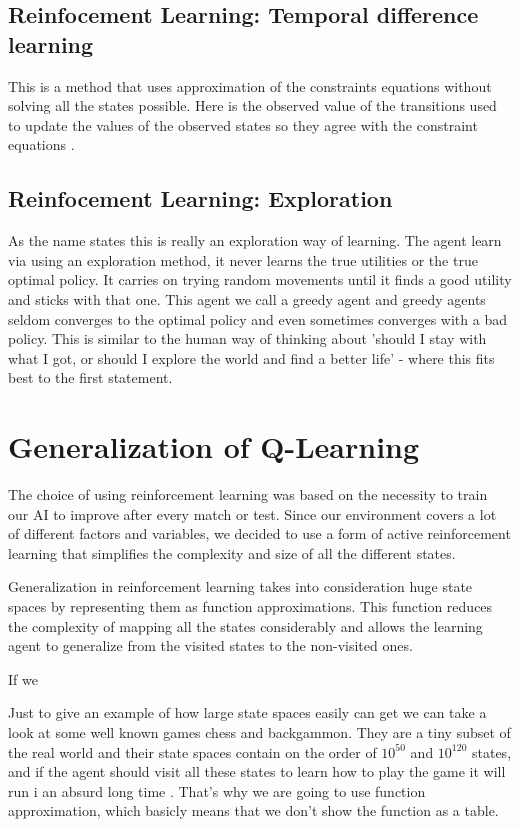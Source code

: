 \subsection*{Reinfocement Learning: Temporal difference learning}
This is a method that uses approximation of the constraints equations without solving all the states possible. Here is the observed value of the transitions used to update the values of the observed states so they agree with the constraint equations \cite[p. 767]{rl}. 

\subsection*{Reinfocement Learning: Exploration}
As the name states this is really an exploration way of learning. The agent learn via using an exploration method, it never learns the true utilities or the true optimal policy. It carries on trying random movements until it finds a good utility and sticks with that one. This agent we call a greedy agent and greedy agents seldom converges to the optimal policy and even sometimes converges with a bad policy. This is similar to the human way of thinking about 'should I stay with what I got, or should I explore the world and find a better life' - where this fits best to the first statement. \cite[p. 771]{rl}


\section{Generalization of Q-Learning}	\label{qlearning}

The choice of using reinforcement learning was based on the necessity to train our AI to improve after every match or test. Since our environment covers a lot of different factors and variables, we decided to use a form of active reinforcement learning that simplifies the complexity and size of all the different states. 

Generalization in reinforcement learning takes into consideration huge state spaces by representing them as function approximations. This function reduces the complexity of mapping all the states considerably and allows the learning agent to generalize from the visited states to the non-visited ones. 

If we  



Just to give an example of how large state spaces easily can get we can take a look at some well known games chess and backgammon. They are a tiny subset of the real world and their state spaces contain on the order of $10^{50}$ and $10^{120}$ states, and if the agent should visit all these states to learn how to play the game it will run i an absurd long time \cite[p. 777]{rl}. That's why we are going to use function approximation, which basicly means that we don't show the function as a table.



